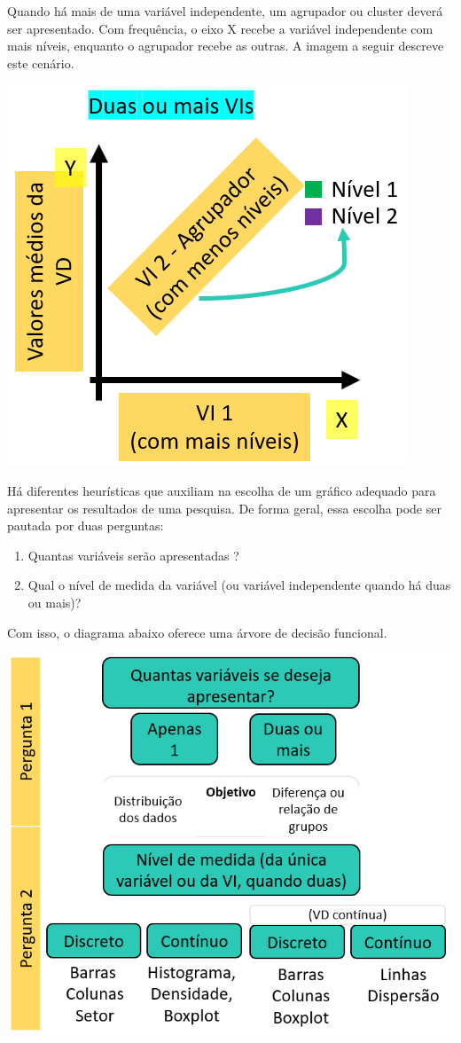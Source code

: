 \documentclass[
]{book}
\providecommand{\tightlist}{%
  \setlength{\itemsep}{0pt}\setlength{\parskip}{0pt}}
\begin{document}
Quando há mais de uma variável independente, um agrupador ou cluster deverá ser apresentado. Com frequência, o eixo X recebe a variável independente com mais níveis, enquanto o agrupador recebe as outras. A imagem a seguir descreve este cenário.

\includegraphics{./img/cap_grafico_tutorial2.png}

Há diferentes heurísticas que auxiliam na escolha de um gráfico adequado para apresentar os resultados de uma pesquisa. De forma geral, essa escolha pode ser pautada por duas perguntas:

\begin{enumerate}
\def\labelenumi{\arabic{enumi}.}
\tightlist
\item
  Quantas variáveis serão apresentadas ?\\
\item
  Qual o nível de medida da variável (ou variável independente quando há duas ou mais)?
\end{enumerate}

Com isso, o diagrama abaixo oferece uma árvore de decisão funcional.

\includegraphics{./img/cap_como_fazer_graficos.png}
\end{document}
